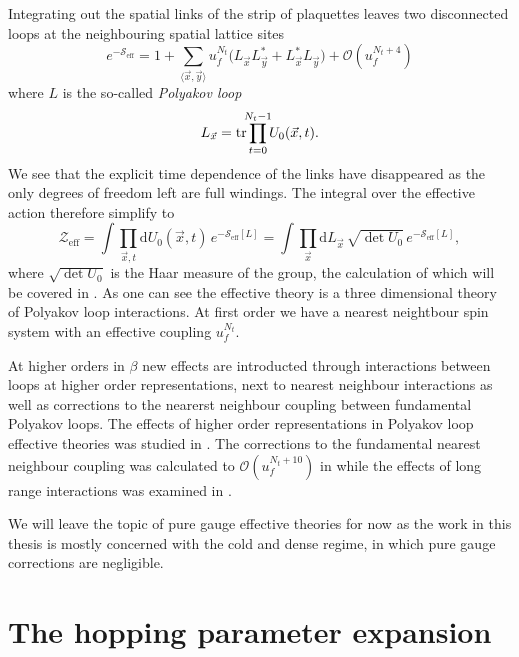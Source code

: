 Integrating out the spatial links of the strip of plaquettes leaves two
disconnected loops at the neighbouring spatial lattice sites
%
\begin{equation}
  e^{-\mathcal{S}_{\text{eff}}} = 1 + \sum_{\langle \vec{x}, \vec{y} \rangle} u_f^{N_t}
  \big( L_{\vec{x}} L^*_{\vec{y}} + L^*_{\vec{x}} L_{\vec{y}} \big) + \mathcal{O}(u_f^{N_t+4})
\end{equation}
%
where $L$ is the so-called \emph{Polyakov loop}
%
\begin{equation}
  L_{\vec{x}} = \tr \prod_{\mathclap{t=0}}^{\mathclap{N_t-1}} U_0(\vec{x},t) .
\end{equation}
%
We see that the explicit time dependence of the links have disappeared as the
only degrees of freedom left are full windings. The integral over the effective
action therefore simplify to
%
\begin{equation}
  \mathcal{Z}_{\text{eff}} = \int \prod_{\vec{x},t} \mathrm{d} U_0(\vec{x},t) \,
    e^{-\mathcal{S}_{\text{eff}}[L]} 
  = \int \prod_{\vec{x}} \mathrm{d} L_{\vec{x}} \, \sqrt{\det U_0} \,
    e^{-\mathcal{S}_{\text{eff}}[L]} ,
\end{equation}
%
where $\sqrt{\det U_0}$ is the Haar measure of the group, the calculation of
which will be covered in . As one can see the effective
theory is a three dimensional theory of Polyakov loop interactions. At first
order we have a nearest neightbour spin system with an effective coupling
$u_f^{N_t}$.

At higher orders in $\beta$ new effects are introducted through interactions
between loops at higher order representations, next to nearest neighbour
interactions as well as corrections to the nearerst neighbour coupling between
fundamental Polyakov loops. The effects of higher order representations in
Polyakov loop effective theories was studied in \citep{Wozar:2007tz}. The
corrections to the fundamental nearest neighbour coupling was calculated to 
$\mathcal{O}(u_f^{N_t + 10})$ in \citep{Langelage:2010yr} while the effects of
long range interactions was examined in \citep{Bergner:2015rza}.

We will leave the topic of pure gauge effective theories for now as the work in
this thesis is mostly concerned with the cold and dense regime, in which pure
gauge corrections are negligible.

\section{The hopping parameter expansion}

